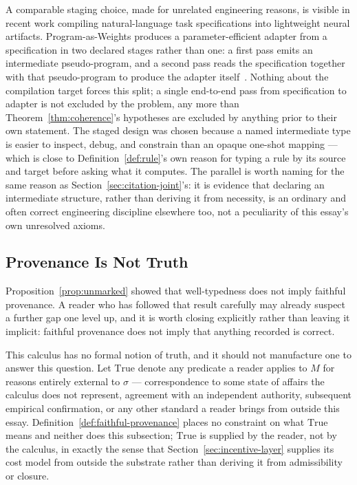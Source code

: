\documentclass[11pt]{article}
\theoremstyle{definition}
\begin{document}
A comparable staging choice, made for unrelated engineering reasons, is visible in recent work compiling natural-language task specifications into lightweight neural artifacts. Program-as-Weights produces a parameter-efficient adapter from a specification in two declared stages rather than one: a first pass emits an intermediate pseudo-program, and a second pass reads the specification together with that pseudo-program to produce the adapter itself~\cite{paw2026}. Nothing about the compilation target forces this split; a single end-to-end pass from specification to adapter is not excluded by the problem, any more than Theorem~\ref{thm:coherence}'s hypotheses are excluded by anything prior to their own statement. The staged design was chosen because a named intermediate type is easier to inspect, debug, and constrain than an opaque one-shot mapping --- which is close to Definition~\ref{def:rule}'s own reason for typing a rule by its source and target before asking what it computes. The parallel is worth naming for the same reason as Section~\ref{sec:citation-joint}'s: it is evidence that declaring an intermediate structure, rather than deriving it from necessity, is an ordinary and often correct engineering discipline elsewhere too, not a peculiarity of this essay's own unresolved axioms.

\subsection{Provenance Is Not Truth}
\label{sec:provenance-not-truth}

Proposition~\ref{prop:unmarked} showed that well-typedness does not imply faithful provenance. A reader who has followed that result carefully may already suspect a further gap one level up, and it is worth closing explicitly rather than leaving it implicit: faithful provenance does not imply that anything recorded is correct.

This calculus has no formal notion of truth, and it should not manufacture one to answer this question. Let $\mathrm{True}$ denote any predicate a reader applies to $M$ for reasons entirely external to $\sigma$ --- correspondence to some state of affairs the calculus does not represent, agreement with an independent authority, subsequent empirical confirmation, or any other standard a reader brings from outside this essay. Definition~\ref{def:faithful-provenance} places no constraint on what $\mathrm{True}$ means and neither does this subsection; $\mathrm{True}$ is supplied by the reader, not by the calculus, in exactly the sense that Section~\ref{sec:incentive-layer} supplies its cost model from outside the substrate rather than deriving it from admissibility or closure.
\end{document}
